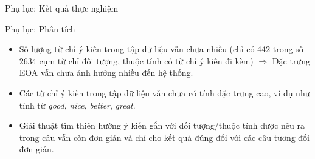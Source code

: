\documentclass[9pt,xcolor=table,hyperref=unicode]{beamer}
\begin{document}
		\begin{frame}{Phụ lục: Kết quả thực nghiệm}
			\begin{table}[]
				\LARGE
				\centering
				\caption{Kết quả thực nghiệm}
			\end{table}	
		\end{frame}

		\begin{frame}{Phụ lục: Phân tích}			
			\begin{itemize}
				\item{Số lượng từ chỉ ý kiến trong tập dữ liệu vẫn chưa nhiều (chỉ có 442 trong số 2634 cụm từ chỉ đối tượng, thuộc tính có từ chỉ ý kiến đi kèm) $\Rightarrow$ Đặc trưng EOA vẫn chưa ảnh hưởng nhiều đến hệ thống.}
				\item{Các từ chỉ ý kiến trong tập dữ liệu vẫn chưa có tính đặc trưng cao, ví dụ như tính từ \textit{good}, \textit{nice}, \textit{better}, \textit{great}.}									
				\item{Giải thuật tìm thiên hướng ý kiến gắn với đối tượng/thuộc tính được nêu ra trong câu vẫn còn đơn giản và chỉ cho kết quả đúng đối với các câu tương đối đơn giản.}
			\end{itemize}			
		\end{frame}
\end{document}
